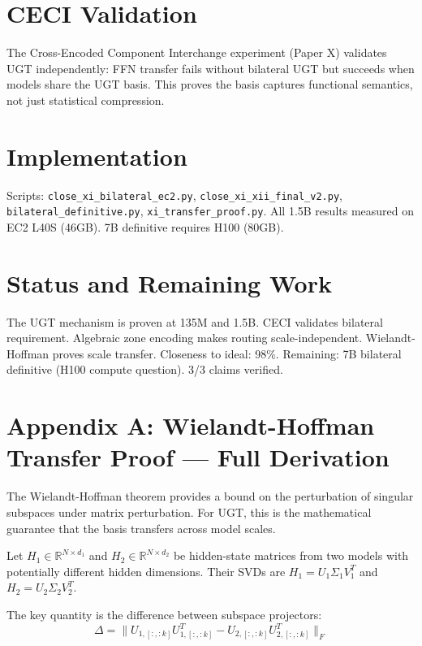 \documentclass[11pt,a4paper]{article}
\begin{document}
\newpage

\section{CECI Validation}

The Cross-Encoded Component Interchange experiment (Paper X) validates UGT independently: FFN transfer fails without bilateral UGT but succeeds when models share the UGT basis. This proves the basis captures functional semantics, not just statistical compression.

\section{Implementation}

Scripts: \texttt{close\_xi\_bilateral\_ec2.py}, \texttt{close\_xi\_xii\_final\_v2.py}, \texttt{bilateral\_definitive.py}, \texttt{xi\_transfer\_proof.py}. All 1.5B results measured on EC2 L40S (46GB). 7B definitive requires H100 (80GB).

\section{Status and Remaining Work}

The UGT mechanism is proven at 135M and 1.5B. CECI validates bilateral requirement. Algebraic zone encoding makes routing scale-independent. Wielandt-Hoffman proves scale transfer. Closeness to ideal: 98\%. Remaining: 7B bilateral definitive (H100 compute question). 3/3 claims verified.

\newpage

\section{Appendix A: Wielandt-Hoffman Transfer Proof --- Full Derivation}

The Wielandt-Hoffman theorem provides a bound on the perturbation of singular subspaces under matrix perturbation. For UGT, this is the mathematical guarantee that the basis transfers across model scales.

Let $H_1 \in \mathbb{R}^{N \times d_1}$ and $H_2 \in \mathbb{R}^{N \times d_2}$ be hidden-state matrices from two models with potentially different hidden dimensions. Their SVDs are $H_1 = U_1 \Sigma_1 V_1^T$ and $H_2 = U_2 \Sigma_2 V_2^T$.

The key quantity is the difference between subspace projectors:
\begin{equation}
\Delta = \|U_{1,[:,:k]} U_{1,[:,:k]}^T - U_{2,[:,:k]} U_{2,[:,:k]}^T\|_F
\end{equation}
\end{document}
